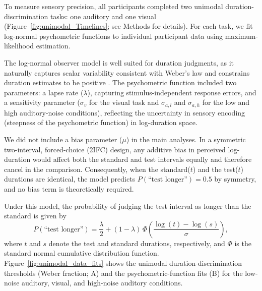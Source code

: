 \documentclass[9pt,lineno,doublespacing]{elife}
\begin{document}
To measure sensory precision, all participants completed two unimodal duration-discrimination tasks: one auditory and one visual (Figure~\ref{fig:unimodal_Timelines}; see Methods for details). For each task, we fit log-normal psychometric functions to individual participant data using maximum-likelihood estimation.

The log-normal observer model is well suited for duration judgments, as it naturally captures scalar variability consistent with Weber’s law and constrains duration estimates to be positive \citep{haigh2021role}. The psychometric function included two parameters: a lapse rate ($\lambda$), capturing stimulus-independent response errors, and a sensitivity parameter ($\sigma_v$ for the visual task and $\sigma_{a,l}$ and $\sigma_{a,h}$ for the low and high auditory-noise conditions), reflecting the uncertainty in sensory encoding (steepness of the psychometric function) in log-duration space.

We did not include a bias parameter ($\mu$) in the main analyses. In a symmetric two-interval, forced-choice (2IFC) design, any additive bias in perceived log-duration would affect both the standard and test intervals equally and therefore cancel in the comparison. Consequently, when  the standard($t$) and the test($t$) durations are identical, the model predicts $P(\text{``test longer''}) = 0.5$ by symmetry, and no bias term is theoretically required. 

Under this model, the probability of judging the test interval as longer than the standard is given by
\begin{equation}
P(\text{``test longer''}) = \frac{\lambda}{2} + (1-\lambda)\,
\Phi\!\left(\frac{\log(t)-{\log(s)}}{\sigma}\right),
\end{equation}
where $t$ and $s$ denote the test and standard durations, respectively, and $\Phi$ is the standard normal cumulative distribution function. Figure~\ref{fig:unimodal_data_fits} shows the unimodal duration-discrimination thresholds (Weber fraction; A) and the psychometric-function fits (B) for the low-noise auditory, visual, and high-noise auditory conditions.
\end{document}

